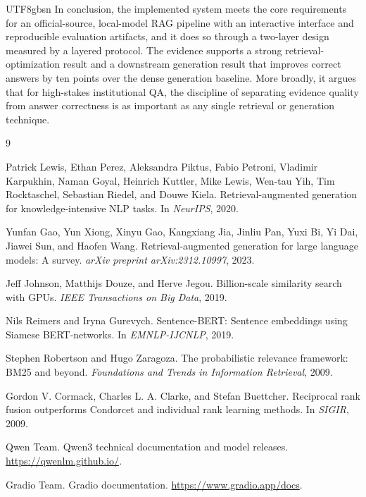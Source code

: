\documentclass{article}
\begin{document}
\begin{CJK*}{UTF8}{gbsn}
In conclusion, the implemented system meets the core requirements for an official-source, local-model RAG pipeline with an interactive interface and reproducible evaluation artifacts, and it does so through a two-layer design measured by a layered protocol. The evidence supports a strong retrieval-optimization result and a downstream generation result that improves correct answers by ten points over the dense generation baseline. More broadly, it argues that for high-stakes institutional QA, the discipline of separating evidence quality from answer correctness is as important as any single retrieval or generation technique.

\begin{thebibliography}{9}

Patrick Lewis, Ethan Perez, Aleksandra Piktus, Fabio Petroni, Vladimir Karpukhin, Naman Goyal, Heinrich Kuttler, Mike Lewis, Wen-tau Yih, Tim Rocktaschel, Sebastian Riedel, and Douwe Kiela.
\newblock Retrieval-augmented generation for knowledge-intensive NLP tasks.
\newblock In \emph{NeurIPS}, 2020.

Yunfan Gao, Yun Xiong, Xinyu Gao, Kangxiang Jia, Jinliu Pan, Yuxi Bi, Yi Dai, Jiawei Sun, and Haofen Wang.
\newblock Retrieval-augmented generation for large language models: A survey.
\newblock \emph{arXiv preprint arXiv:2312.10997}, 2023.

Jeff Johnson, Matthijs Douze, and Herve Jegou.
\newblock Billion-scale similarity search with GPUs.
\newblock \emph{IEEE Transactions on Big Data}, 2019.

Nils Reimers and Iryna Gurevych.
\newblock Sentence-BERT: Sentence embeddings using Siamese BERT-networks.
\newblock In \emph{EMNLP-IJCNLP}, 2019.

Stephen Robertson and Hugo Zaragoza.
\newblock The probabilistic relevance framework: BM25 and beyond.
\newblock \emph{Foundations and Trends in Information Retrieval}, 2009.

Gordon V. Cormack, Charles L. A. Clarke, and Stefan Buettcher.
\newblock Reciprocal rank fusion outperforms Condorcet and individual rank learning methods.
\newblock In \emph{SIGIR}, 2009.

Qwen Team.
\newblock Qwen3 technical documentation and model releases.
\newblock \url{https://qwenlm.github.io/}.

Gradio Team.
\newblock Gradio documentation.
\newblock \url{https://www.gradio.app/docs}.

\end{thebibliography}

\end{CJK*}
\end{document}
